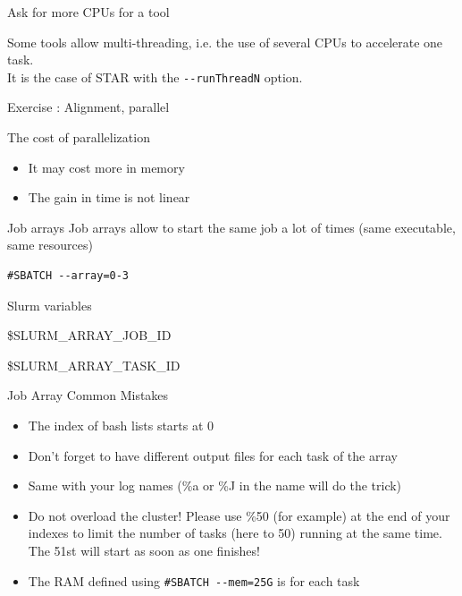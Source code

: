 \documentclass{beamer}
\begin{document}
\begin{frame}[fragile]{Ask for more CPUs for a tool}

Some tools allow multi-threading, i.e. the use of several CPUs to accelerate one task. \\
It is the case of STAR with the \verb|--runThreadN| option. 

\begin{block}{Exercise : Alignment, parallel}
\end{block}

\end{frame}

\begin{frame}{The cost of parallelization}
\begin{itemize}
    \item It may cost more in memory
    \item The gain in time is not linear
\end{itemize}
\end{frame}

\begin{frame}[fragile]{Job arrays}
Job arrays allow to start the same job a lot of times (same executable, same resources)

\vspace{10pt}

\begin{verbatim}
#SBATCH --array=0-3
\end{verbatim}

Slurm variables

\$SLURM\_ARRAY\_JOB\_ID

\$SLURM\_ARRAY\_TASK\_ID


\end{frame}


\begin{frame}[fragile]{Job Array Common Mistakes}
\begin{itemize}
    \item The index of bash lists starts at 0
    \item Don't forget to have different output files for each task of the array
    \item Same with your log names (\%a or \%J in the name will do the trick)
    \item Do not overload the cluster! Please use \%50 (for example) at the end of your indexes to limit the number of tasks (here to 50) running at the same time. The 51st will start as soon as one finishes!
    \item The RAM defined using \verb|#SBATCH --mem=25G| is for each task
\end{itemize}
    
\end{frame}
\end{document}
